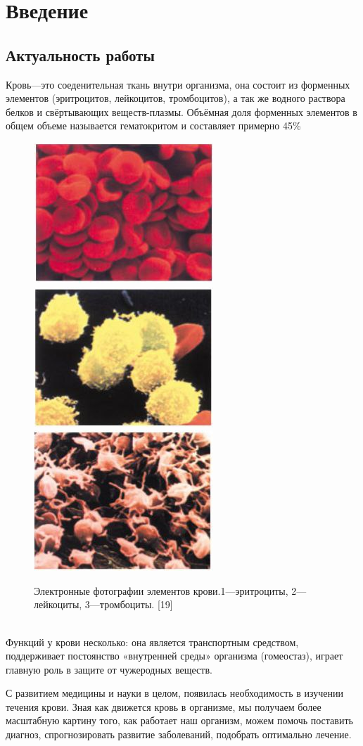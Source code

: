 \section{Введение}
\subsection{Актуальность работы}
Кровь—это соеденительная ткань внутри организма, она состоит из форменных элементов (эритроцитов, лейкоцитов, тромбоцитов), а так же водного раствора белков и свёртывающих веществ-плазмы. Объёмная доля форменных элементов в общем объеме называется гематокритом и составляет примерно 45\%
\begin{figure}[h]
\centering
\includegraphics[width=0.3\linewidth]{erotr.jpg}
\includegraphics[width=0.3\linewidth]{leiko.jpg}
\includegraphics[width=0.3\linewidth]{trombo.jpg}
\caption{ Электронные фотографии элементов крови.1—эритроциты, 2—лейкоциты, 3—тромбоциты. [19]}
\label{fig:mpr}
\end{figure}\\

Функций у крови несколько: она является транспортным средством, поддерживает постоянство «внутренней среды» организма (гомеостаз), играет главную роль в защите от чужеродных веществ.

С развитием медицины и науки в целом, появилась необходимость в изучении течения крови. Зная как движется кровь в организме, мы получаем более масштабную картину того, как работает наш организм, можем помочь поставить диагноз, спрогнозировать развитие заболеваний, подобрать оптимально лечение.

